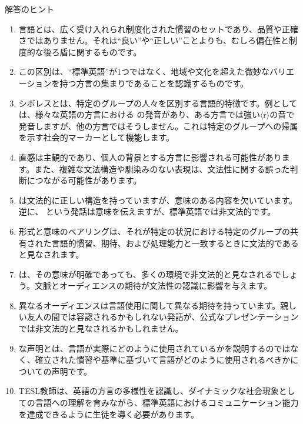 \begin{tblsfilled}{解答のヒント}

\begin{enumerate}[noitemsep, leftmargin=*]
    \item {}言語とは、広く受け入れられ制度化された慣習のセットであり、品質や正確さではありません。それは\enquote{良い}や\enquote{正しい}ことよりも、むしろ偏在性と制度的な後ろ盾に関するものです。
    \item この区別は、\enquote{標準英語}が1つではなく、地域や文化を超えた微妙なバリエーションを持つ方言の集まりであることを認識するものです。
    \item シボレスとは、特定のグループの人々を区別する言語的特徴です。例としては、様々な英語の方言における  の発音があり、ある方言では強い$\langle$r$\rangle$の音で発音しますが、他の方言ではそうしません。これは特定のグループへの帰属を示す社会的マーカーとして機能します。
    \item 直感は主観的であり、個人の背景とする方言に影響される可能性があります。また、複雑な文法構造や馴染みのない表現は、文法性に関する誤った判断につながる可能性があります。
    \item {} は文法的に正しい構造を持っていますが、意味のある内容を欠いています。逆に、 という発話は意味を伝えますが、標準英語では非文法的です。
    \item 形式と意味のペアリングは、それが特定の状況における特定のグループの共有された言語的慣習、期待、および処理能力と一致するときに文法的であると見なされます。
    \item {} は、その意味が明確であっても、多くの環境で非文法的と見なされるでしょう。文脈とオーディエンスの期待が文法性の認識に影響を与えます。
    \item 異なるオーディエンスは言語使用に関して異なる期待を持っています。親しい友人の間では容認されるかもしれない発話が、公式なプレゼンテーションでは非文法的と見なされるかもしれません。
    \item {}な声明とは、言語が実際にどのように使用されているかを説明するのではなく、確立された慣習や基準に基づいて言語がどのように使用されるべきかについての声明です。
    \item TESL教師は、英語の方言の多様性を認識し、ダイナミックな社会現象としての言語への理解を育みながら、標準英語におけるコミュニケーション能力を達成できるように生徒を導く必要があります。
\end{enumerate}
\end{tblsfilled}

